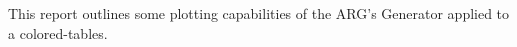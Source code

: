 This report outlines some plotting capabilities of the ARG's Generator applied to a colored-tables.
